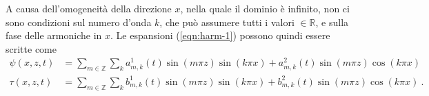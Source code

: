 A causa dell'omogeneità della direzione $x$, nella quale il dominio è infinito, non ci sono condizioni sul numero d'onda $k$, che può assumere tutti i valori $\in \mathbb{R}$, e sulla fase delle armoniche in $x$. Le espansioni (\ref{eqn:harm-1}) possono quindi essere scritte come
\begin{equation}\label{eqn:harm-2}
\begin{aligned}
    \psi(x,z,t) & = \sum_{m \in \mathbb{Z}} \sum_k a^1_{m,k}(t) \sin{(m\pi z)} \sin{(k\pi x )} +  a^2_{m,k}(t) \sin{(m\pi z)} \cos{(k \pi x)} \\
    \tau(x,z,t) & = \sum_{m \in \mathbb{Z}} \sum_k b^1_{m,k}(t) \sin{(m\pi z)} \sin{(k\pi x )} + b^2_{m,k}(t) \sin{(m\pi z)} \cos{(k \pi x)}  \ .
\end{aligned}
\end{equation}

